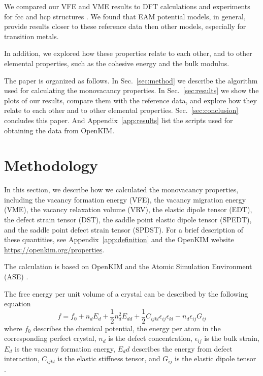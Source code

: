 \documentclass[%
 reprint,
 amsmath,amssymb,
 aps,
]{revtex4-1}
\begin{document}
We compared our VFE and VME results to DFT calculations and experiments for fcc and hcp structures \cite{angsten2014elemental}.
We found that EAM potential models, in general, provide results closer to these reference data then other models, especially for transition metals.

In addition, we explored how these properties relate to each other, and to other elemental properties, such as the cohesive energy and the bulk modulus.

The paper is organized as follows.
In Sec.~\ref{sec:method} we describe the algorithm used for calculating the monovacancy properties.
In Sec.~\ref{sec:results} we show the plots of our results, compare them with the reference data, and explore how they relate to each other and to other elemental properties.
Sec.~\ref{sec:conclusion} concludes this paper.
And Appendix~\ref{app:results} list the scripts used for obtaining the data from OpenKIM.

\section{\label{sec:method}Methodology}

In this section, we describe how we calculated the monovacancy properties, including the vacancy formation energy (VFE), the vacancy migration energy (VME), the vacancy relaxation volume (VRV), the elastic dipole tensor (EDT), the defect strain tensor (DST), the saddle point elastic dipole tensor (SPEDT), and the saddle point defect strain tensor (SPDST).
For a brief description of these quantities, see Appendix~\ref{app:definition} and the OpenKIM website \url{https://openkim.org/properties}.

The calculation is based on OpenKIM and the Atomic Simulation Environment (ASE) \cite{bahn2002object}.

The free energy per unit volume of a crystal can be described by the following equation
\begin{equation}\label{eq:f}
f = f_0 + n_dE_d + \frac{1}{2}n_d^2E_{dd} + \frac{1}{2}C_{ijkl}\epsilon_{ij}\epsilon_{kl} - n_d\epsilon_{ij}G_{ij}
\end{equation}
where $f_0$ describes the chemical potential, the energy per atom in the corresponding perfect crystal, $n_d$ is the defect concentration, $\epsilon_{ij}$ is the bulk strain, $E_d$ is the vacancy formation energy, $E_dd$ describes the energy from defect interaction, $C_{ijkl}$ is the elastic stiffness tensor, and $G_{ij}$ is the elastic dipole tensor \cite{freedman2009elastic}.
\end{document}
